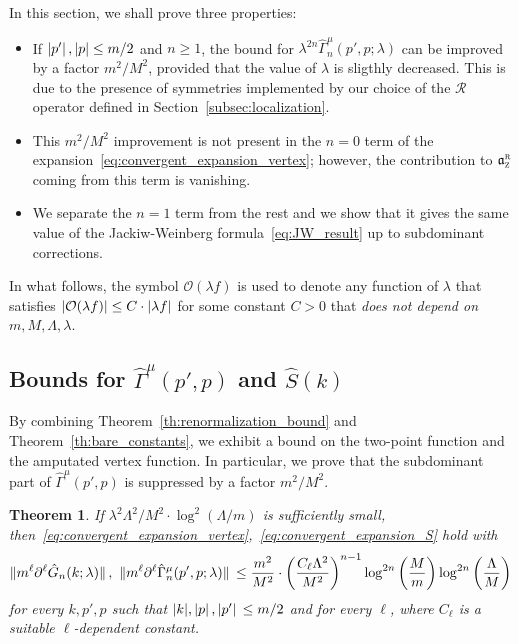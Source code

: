 \documentclass[a4paper, 11pt]{article}
\newcommand{\gyr}{\mathfrak{a}}								%
\newcommand{\rgyr}{\gyr_\textsc{z}^\textsc{r}}
\newcommand{\BigO}{\mathcal{O}}								%
\newcommand{\cutoff}{\Lambda}								%
\newcommand{\ren}{\mathcal{R}}								%
\theoremstyle{thm}
\newtheorem{theorem}{Theorem}
\begin{document}
In this section, we shall prove three properties:
\begin{itemize}
\item If $\abs*{p'}, \abs{p} \le m/2$ and $n \ge 1$, the bound for $\lambda^{2n} \hat{\Gamma}^\mu_n(p', p; \lambda)$ can be improved by a factor $m^2/M^2$, provided that the value of $\lambda$ is sligthly decreased. This is due to the presence of symmetries implemented by our choice of the $\ren$ operator defined in Section~\ref{subsec:localization}.
\item This $m^2/M^2$ improvement is not present in the $n = 0$ term of the expansion~\eqref{eq:convergent_expansion_vertex}; however, the contribution to $\rgyr$ coming from this term is vanishing.
\item We separate the $n = 1$ term from the rest and we show that it gives the same value of the Jackiw-Weinberg formula~\eqref{eq:JW_result} up to subdominant corrections.
\end{itemize}

In what follows, the symbol $\BigO(\lambda f)$ is used to denote any function of $\lambda$ that satisfies $\abs{\BigO(\lambda f)} \le C \cdot \abs{\lambda f}$ for some constant $C > 0$ that \emph{does not depend on $m, M, \cutoff, \lambda$}.

\subsection{Bounds for \texorpdfstring{$\hat{\Gamma}^\mu(p', p)$}{G} and \texorpdfstring{$\hat{S}(k)$}{S}}

\label{subsec:bounds_on_propagator_and_vertex}

By combining Theorem~\ref{th:renormalization_bound} and Theorem~\ref{th:bare_constants}, we exhibit a bound on the two-point function and the amputated vertex function. In particular, we prove that the subdominant part of $\hat{\Gamma}^\mu(p', p)$ is suppressed by a factor $m^2/M^2$.

\begin{theorem}
\label{th:convergent_expansions}
If $\lambda^2 \cutoff^2/M^2 \cdot \log^2(\cutoff/m)$ is sufficiently small, then~\eqref{eq:convergent_expansion_vertex},~\eqref{eq:convergent_expansion_S} hold with
\begin{equation}
\label{eq:bounds_on_S_and_Gamma}
\norm*{m^\ell \partial^\ell \hat{G}_n(k; \lambda)}, \,\, \norm*{m^\ell \partial^\ell \hat{\Gamma}^\mu_n(p', p; \lambda)} \le \frac{m^2}{M^2} \cdot \left(\frac{C_\ell \cutoff^2}{M^2} \right)^{n - 1} \log^{2n} \left( \frac{M}{m} \right) \log^{2n} \left( \frac{\cutoff}{M} \right)
\end{equation}
for every $k, p', p$ such that $\abs{k}, \abs*{p}, \abs*{p'} \le m/2$ and for every $\ell$, where $C_\ell$ is a suitable $\ell$-dependent constant.
\end{theorem}
\end{document}
